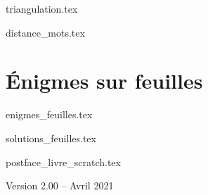 \documentclass[11pt,twoside]{report}
\begin{document}
{triangulation.tex}

{distance_mots.tex}

\clearemptydoublepage
\setcounter{chapter}{0}

\part{Énigmes sur feuilles}

{enigmes_feuilles.tex}

{solutions_feuilles.tex}



{postface_livre_scratch.tex}

\vfill
\bigskip
\bigskip

\centerline{Version 2.00 -- Avril 2021}
\end{document}
